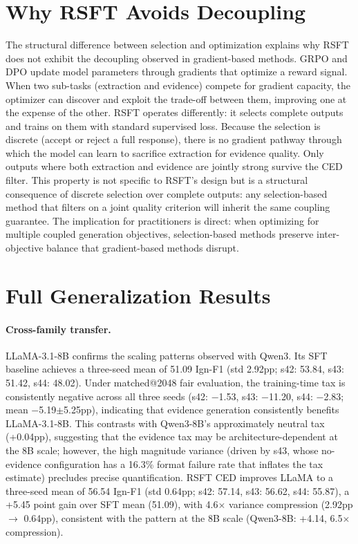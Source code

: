 \section{Why RSFT Avoids Decoupling}
\label{sec:rsft_theory}

The structural difference between selection and optimization explains why RSFT does not exhibit the decoupling observed in gradient-based methods. GRPO and DPO update model parameters through gradients that optimize a reward signal. When two sub-tasks (extraction and evidence) compete for gradient capacity, the optimizer can discover and exploit the trade-off between them, improving one at the expense of the other. RSFT operates differently: it selects complete outputs and trains on them with standard supervised loss. Because the selection is discrete (accept or reject a full response), there is no gradient pathway through which the model can learn to sacrifice extraction for evidence quality. Only outputs where both extraction and evidence are jointly strong survive the CED filter. This property is not specific to RSFT's design but is a structural consequence of discrete selection over complete outputs: any selection-based method that filters on a joint quality criterion will inherit the same coupling guarantee. The implication for practitioners is direct: when optimizing for multiple coupled generation objectives, selection-based methods preserve inter-objective balance that gradient-based methods disrupt.


\section{Full Generalization Results}
\label{sec:generalization_full}

\paragraph{Cross-family transfer.}
LLaMA-3.1-8B confirms the scaling patterns observed with Qwen3. Its SFT baseline achieves a three-seed mean of 51.09 Ign-F1 (std 2.92pp; s42: 53.84, s43: 51.42, s44: 48.02). Under matched@2048 fair evaluation, the training-time tax is consistently negative across all three seeds (s42: $-$1.53, s43: $-$11.20, s44: $-$2.83; mean $-$5.19$\pm$5.25pp), indicating that evidence generation consistently benefits LLaMA-3.1-8B. This contrasts with Qwen3-8B's approximately neutral tax (+0.04pp), suggesting that the evidence tax may be architecture-dependent at the 8B scale; however, the high magnitude variance (driven by s43, whose no-evidence configuration has a 16.3\% format failure rate that inflates the tax estimate) precludes precise quantification. RSFT CED improves LLaMA to a three-seed mean of 56.54 Ign-F1 (std 0.64pp; s42: 57.14, s43: 56.62, s44: 55.87), a +5.45 point gain over SFT mean (51.09), with 4.6$\times$ variance compression (2.92pp $\to$ 0.64pp), consistent with the pattern at the 8B scale (Qwen3-8B: +4.14, 6.5$\times$ compression).

